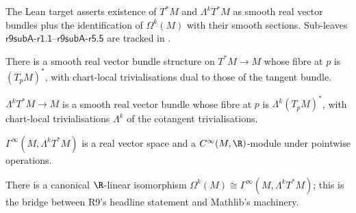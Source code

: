 \begin{theorem}
\label{input:cotangent-alternating-bundle}
The Lean target
asserts existence of \(T^{*}M\) and \(\Lambda^{k}T^{*}M\) as smooth
real vector bundles plus the identification of \(\Omega^{k}(M)\)
with their smooth sections.  Sub-leaves
\(\textsf{r9subA-r1.1}\)--\(\textsf{r9subA-r5.5}\) are tracked in
.
\leanok
\end{theorem}

\begin{lemma}
\label{lem:r9subA-cotangent-bundle}
There is a smooth real vector bundle structure on
\(T^{*}M\to M\) whose fibre at \(p\) is \((T_{p}M)^{*}\), with
chart-local trivialisations dual to those of the tangent bundle.
\leanok
\end{lemma}

\begin{lemma}
\label{lem:r9subA-exterior-power-bundle}
\(\Lambda^{k}T^{*}M\to M\) is a smooth real vector bundle whose
fibre at \(p\) is \(\Lambda^{k}(T_{p}M)^{*}\), with chart-local
trivialisations \(\Lambda^{k}\) of the cotangent trivialisations.
\leanok
\end{lemma}

\begin{lemma}
\label{lem:r9subA-smooth-sections-module}
\(\Gamma^{\infty}(M,\Lambda^{k}T^{*}M)\) is a real vector space
and a \(C^{\infty}(M,\R)\)-module under pointwise operations.
\leanok
\end{lemma}

\begin{lemma}
\label{lem:r9subA-omega-eq-sections}
There is a canonical \(\R\)-linear isomorphism
\(\Omega^{k}(M)\cong\Gamma^{\infty}(M,\Lambda^{k}T^{*}M)\); this
is the bridge between R9's headline statement and Mathlib's
 machinery.
\leanok
\end{lemma}


